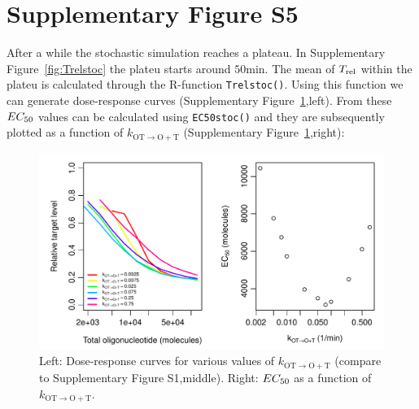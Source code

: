 \documentclass[a4paper,11pt]{article}
\newenvironment{Ncenter}{%
  \setlength\topsep{-10pt}
  \setlength\parskip{-100pt}
  \begin{center}
}{%
  \end{center}
}
\newcommand{\kmo}{k_{\mathrm{OT \to O+T}}}
\newcommand{\Trel}{T_{\rm{rel}}}
\newcommand{\EC}{EC_{\rm{50}}}
\begin{document}
\section{Supplementary Figure S5}
After a while the stochastic simulation reaches a plateau. In Supplementary Figure~\ref{fig:Trelstoc} the plateu starts around $50$min. The mean of $\Trel$ within the plateu is calculated through the R-function \texttt{Trelstoc()}. Using this function we can generate dose-response curves (Supplementary Figure~\ref{fig:stocEC50},left). From these $\EC$ values can be calculated using \texttt{EC50stoc()} and they are subsequently plotted as a function of $\kmo$ (Supplementary Figure~\ref{fig:stocEC50},right):
\begin{Schunk}
\end{Schunk}
\begin{figure}[!h]
\begin{Ncenter}
\includegraphics[width=\textwidth]{SuppFile1-EC50.pdf}
\end{Ncenter}
\caption{Left: Dose-response curves for various values of $\kmo$ (compare to Supplementary Figure S1,middle). Right: $\EC$ as a function of $\kmo$.}\label{fig:stocEC50}
\end{figure}
\newpage
\end{document}
